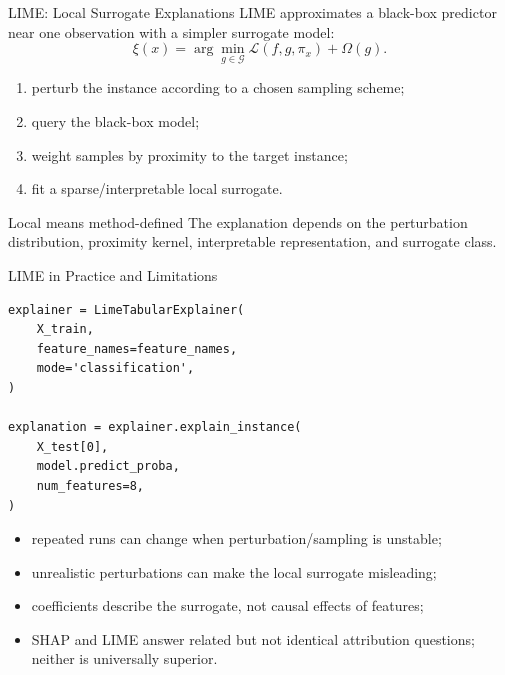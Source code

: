 \begin{frame}{LIME: Local Surrogate Explanations}
LIME approximates a black-box predictor near one observation with a simpler surrogate model:
\[
  \xi(x)=\arg\min_{g\in\mathcal G}
  \mathcal L(f,g,\pi_x)+\Omega(g).
\]

\begin{enumerate}
  \item perturb the instance according to a chosen sampling scheme;
  \item query the black-box model;
  \item weight samples by proximity to the target instance;
  \item fit a sparse/interpretable local surrogate.
\end{enumerate}

\begin{alertblock}{Local means method-defined}
The explanation depends on the perturbation distribution, proximity kernel, interpretable representation, and surrogate class.
\end{alertblock}
\end{frame}

\begin{frame}[fragile]{LIME in Practice and Limitations}
\begin{lstlisting}[style=code,basicstyle=\ttfamily\small]
explainer = LimeTabularExplainer(
    X_train,
    feature_names=feature_names,
    mode='classification',
)

explanation = explainer.explain_instance(
    X_test[0],
    model.predict_proba,
    num_features=8,
)
\end{lstlisting}

\begin{itemize}
  \item repeated runs can change when perturbation/sampling is unstable;
  \item unrealistic perturbations can make the local surrogate misleading;
  \item coefficients describe the surrogate, not causal effects of features;
  \item SHAP and LIME answer related but not identical attribution questions; neither is universally superior.
\end{itemize}
\end{frame}


